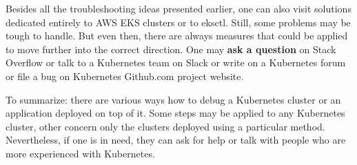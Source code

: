 Besides all the troubleshooting ideas presented earlier, one can also visit solutions dedicated entirely to AWS EKS clusters\cite{k8s-eks-tr} or to eksctl\cite{k8s-eksctl-tr}. Still, some problems may be tough to handle. But even then, there are always measures that could be applied to move further into the correct direction. One may \textbf{ask a question} on Stack Overflow or talk to a Kubernetes team on Slack or write on a Kubernetes forum or file a bug on Kubernetes Github.com project website\cite{k8s-deb-ask}.

To summarize: there are various ways how to debug a Kubernetes cluster or an application deployed on top of it. Some steps may be applied to any Kubernetes cluster, other concern only the clusters deployed using a particular method. Nevertheless, if one is in need, they can ask for help or talk with people who are more experienced with Kubernetes.
